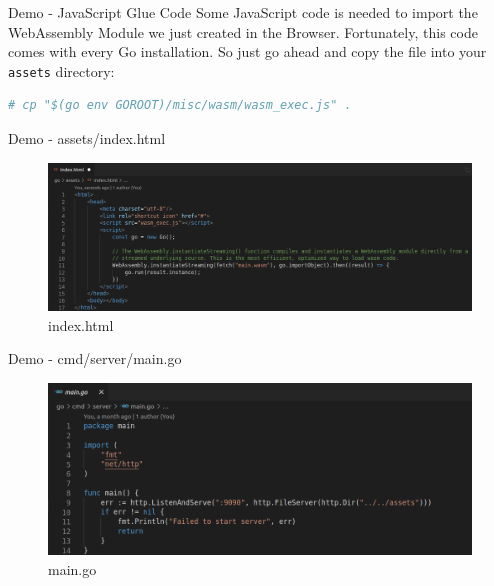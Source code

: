 \documentclass{beamer}
\begin{document}
\begin{frame}[fragile]{Demo - JavaScript Glue Code}
    Some JavaScript code is needed to import the WebAssembly Module we just created in the Browser. Fortunately, this code comes with every Go installation. So just go ahead and copy the file into your \lstinline{assets} directory:

    \begin{lstlisting}[language=Bash,basicstyle=\scriptsize]
# cp "$(go env GOROOT)/misc/wasm/wasm_exec.js" .
\end{lstlisting}
\end{frame}

\begin{frame}{Demo - assets/index.html}
    \begin{figure}
        \includegraphics[scale=0.2]{./images/idx.png}
        \caption{index.html}
    \end{figure}
\end{frame}

\begin{frame}{Demo - cmd/server/main.go}
    \begin{figure}
        \includegraphics[scale=0.3]{./images/server.png}
        \caption{main.go}
    \end{figure}
\end{frame}
\end{document}
